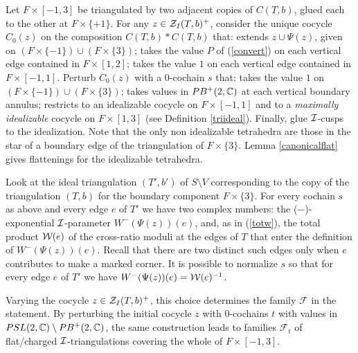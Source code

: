 Let $F\times [-1,3]$ be triangulated by two adjacent copies of
$C(T,b)$, glued each to the other at $F\times \{+1\}$. For any $z \in
{\mathcal Z}_I(T,b)^+$, consider the unique cocycle $C_0(z)$ on the composition
$C(T,b)*C(T,b)$ that: extends $z\cup \Psi(z)$, given on $(F\times
\{-1\})\cup (F\times \{3\})$; takes the value $P$ of (\ref{convert})
on each vertical edge contained in $F\times [1,2]$; takes the value
$1$ on each vertical edge contained in $F\times [-1,1]$. Perturb
$C_0(z)$ with a $0$-cochain $s$ that: takes the value $1$ on $(F\times
\{-1\})\cup (F\times \{3\})$; takes values in $PB^+(2,{\mathbb C})$ at each
vertical boundary annulus; restricts to an idealizable cocycle on
$F\times [-1,1]$ and to a {\it maximally idealizable} cocycle on
$F\times [1,3]$ (see Definition \ref{triideal}). Finally, glue
${\mathcal I}$-cusps to the idealization.  Note that the only non idealizable
tetrahedra are those in the star of a boundary edge of the
triangulation of $F\times \{3\}$.  Lemma \ref{canonicalflat} gives
flattenings for the idealizable tetrahedra.

Look at the ideal triangulation $(T',b')$ of $S\setminus V$
corresponding to the copy of the triangulation $(T,b)$ for the
boundary component $F\times \{3\}$. For every cochain $s$ as above and
every edge $e$ of $T'$ we have two complex numbers: the
($-$)-exponential ${\mathcal I}$-parameter $W^-(\Psi(z))(e)$, and, as in
(\ref{totw}), the total product ${\mathcal W}(e)$ of the cross-ratio moduli at
the edges of $T$ that enter the definition of
$W^-(\Psi(z))(e)$. Recall that there are two distinct such edges only when $e$
contributes to make a marked corner. It is possible to normalize $s$
so that for every edge $e$ of $T'$ we have $W^-(\Psi(z))(e) =
{\mathcal W}(e)^{-1}$. 

Varying the cocycle $z \in {\mathcal Z}_I(T,b)^+$, this choice determines the
family $\mathcal{F}$ in the statement. By perturbing the initial
cocycle $z$ with $0$-cochains $t$ with values in $PSL(2,\mathbb{C})\setminus
PB^+(2,\mathbb{C})$, the same construction leads to families $\mathcal{F}_t$
of flat/charged ${\mathcal I}$-triangulations covering the whole of $F \times
[-1,3]$. 

